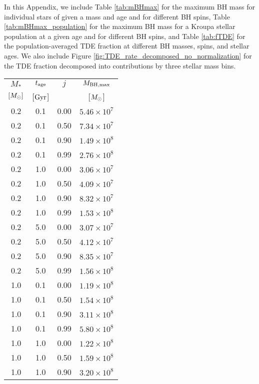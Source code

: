\documentclass[useAMS,usenatbib]{mn2e}
\def\msun{M_{\rm \odot}}
\def\mstar{M_*}
\def\mBHmax{M_{\rm BH,\max}}
\def\tage{t_{\rm age}}
\def\Gyr{{\rm Gyr}}
\begin{document}
In this Appendix, we include Table \ref{tab:mBHmax} for the maximum BH mass for individual stars of given a mass and age and for different BH spins, Table \ref{tab:mBHmax_population} for the maximum BH mass for a Kroupa stellar population at a given age and for different BH spins, and Table \ref{tab:fTDE} for the population-averaged TDE fraction at different BH masses, spins, and stellar ages. We also include Figure \ref{fig:TDE_rate_decomposed_no_normalization} for the TDE fraction decomposed into contributions by three stellar mass bins.

\begin{table}
    \centering
    \begin{tabular}{cccc}
        \hline
        $\mstar$ & $\tage$ & $j$  & $\mBHmax$\\
        $[\msun]$ & [$\Gyr$] & & [$\msun$]\\
        \hline
           0.2 &   0.1 & 0.00 & $5.46\times10^7$ \\
           0.2 &   0.1 & 0.50 & $7.34\times10^7$ \\
           0.2 &   0.1 & 0.90 & $1.49\times10^8$ \\
           0.2 &   0.1 & 0.99 & $2.76\times10^8$ \\
           0.2 &   1.0 & 0.00 & $3.06\times10^7$ \\
           0.2 &   1.0 & 0.50 & $4.09\times10^7$ \\
           0.2 &   1.0 & 0.90 & $8.32\times10^7$ \\
           0.2 &   1.0 & 0.99 & $1.53\times10^8$ \\
           0.2 &   5.0 & 0.00 & $3.07\times10^7$ \\
           0.2 &   5.0 & 0.50 & $4.12\times10^7$ \\
           0.2 &   5.0 & 0.90 & $8.35\times10^7$ \\
           0.2 &   5.0 & 0.99 & $1.56\times10^8$ \\
           1.0 &   0.1 & 0.00 & $1.19\times10^8$ \\
           1.0 &   0.1 & 0.50 & $1.54\times10^8$ \\
           1.0 &   0.1 & 0.90 & $3.11\times10^8$ \\
           1.0 &   0.1 & 0.99 & $5.80\times10^8$ \\
           1.0 &   1.0 & 0.00 & $1.22\times10^8$ \\
           1.0 &   1.0 & 0.50 & $1.59\times10^8$ \\
           1.0 &   1.0 & 0.90 & $3.20\times10^8$ \\

\end{tabular}
\end{table}
\end{document}

